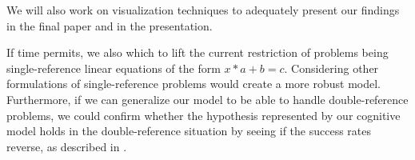 \documentclass[10pt,letterpaper]{article}
\begin{document}
	We will also work on visualization techniques to adequately present our findings in the final paper and in the presentation.
	
	If time permits, we also which to lift the current restriction of problems being single-reference linear equations of the form $x*a+b=c$. Considering other formulations of single-reference problems would create a more robust model. Furthermore, if we can generalize our model to be able to handle double-reference problems, we could confirm whether the hypothesis represented by our cognitive model holds in the double-reference situation by seeing if the success rates reverse, as described in \cite{KoedNath2008}.
	
	
	
	
	
\end{document}
